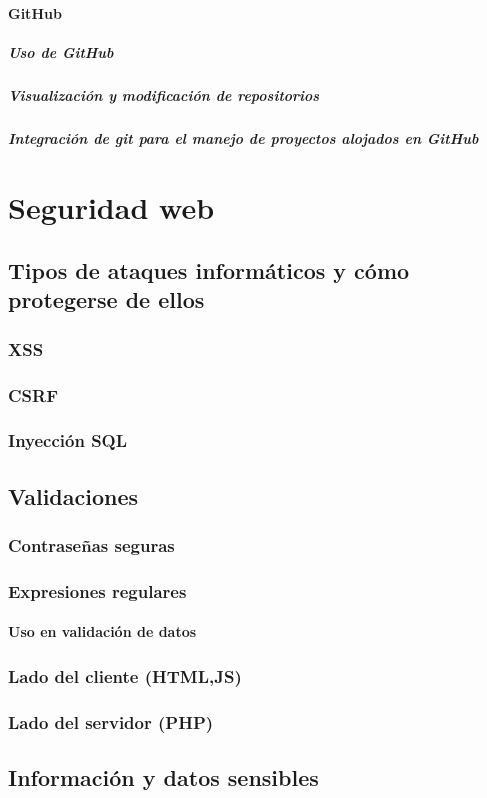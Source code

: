 \documentclass[12pt]{report}
\begin{document}
				\paragraph{GitHub}
					\subparagraph{Uso de GitHub}
					\subparagraph{Visualización y modificación de repositorios}
					\subparagraph{Integración de git para el manejo de proyectos alojados en GitHub}
	\section{Seguridad web}
		\subsection{Tipos de ataques informáticos y cómo protegerse de ellos}
			\subsubsection{XSS}
			\subsubsection{CSRF}
			\subsubsection{Inyección SQL}
		\subsection{Validaciones}
			\subsubsection{Contraseñas seguras}
			\subsubsection{Expresiones regulares}
				\paragraph{Uso en validación de datos}
			\subsubsection{Lado del cliente (HTML,JS)}
			\subsubsection{Lado del servidor (PHP)}
		\subsection{Información y datos sensibles}
\end{document}
